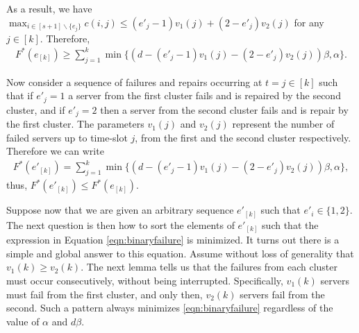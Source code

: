 \documentclass[journal,onecolumn,draftcls]{IEEEtran}
\begin{document}
\begin{IEEEproof}
As a result, we have $\max_{i\in[s+1]\backslash\{e_j\}} c(i,j) \le (e'_j-1) v_1(j)+ (2-e'_j)v_2(j)$ for any $j\in[k]$. Therefore,
\begin{eqnarray*}
F^*(e_{[k]})\ge  \sum_{j = 1}^k \min\{(d - (e'_j-1) v_1(j)- (2-e'_j)v_2(j))\beta,\alpha\}.
\end{eqnarray*}


Now consider a sequence of failures and repairs occurring at $t = j\in [k]$ such that if $e'_j = 1$ a server from the first cluster fails and is repaired by the second cluster, and if $e'_j = 2$ then a server from the second cluster fails and is repair by the first cluster. The parameters $v_1(j)$ and $v_2(j)$ represent the number of failed servers up to time-slot $j$, from the first and the second cluster respectively. Therefore we can write
\begin{eqnarray}
F^*(e'_{[k]}) =  \sum_{j = 1}^k \min\{(d - (e'_j-1) v_1(j)- (2-e'_j)v_2(j))\beta,\alpha\},
\label{eqn:binaryfailure}
\end{eqnarray}
thus, $F^*(e'_{[k]}) \le F^*(e_{[k]})$.

\end{IEEEproof}


Suppose now that we are given an arbitrary sequence $e'_{[k]}$ such that $e'_i\in\{1,2\}$. The next question is then how to sort the elements of $e'_{[k]}$ such that the expression in Equation \eqref{eqn:binaryfailure} is minimized. It turns out there is a simple and global answer to this equation. Assume without loss of generality that $v_1(k)\ge v_2(k)$. The next lemma tells us that the failures from each cluster must occur consecutively, without being interrupted. Specifically, $v_1(k)$ servers must fail from the first cluster, and only then, $v_2(k)$ servers fail from the second. Such a pattern always minimizes \eqref{eqn:binaryfailure} regardless of the value of $\alpha$ and $d\beta$. 
\end{document}

